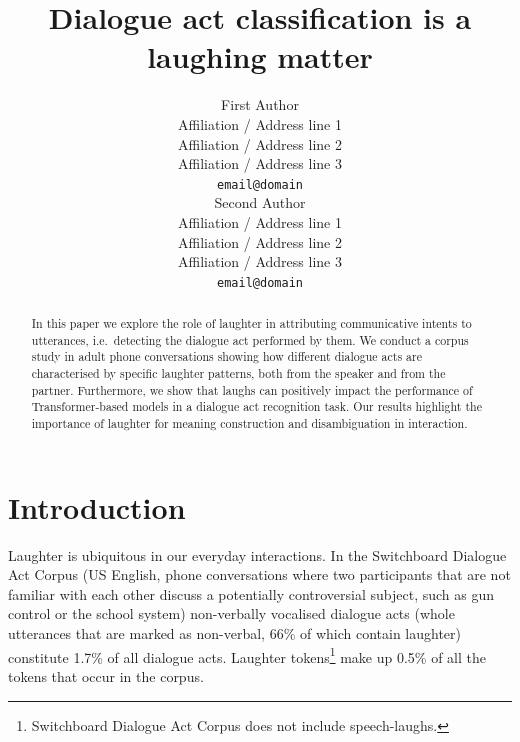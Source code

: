 \documentclass[11pt,a4paper]{article}
\title{Dialogue act classification is a laughing matter}
\author{First Author \\
  Affiliation / Address line 1 \\
  Affiliation / Address line 2 \\
  Affiliation / Address line 3 \\
  \texttt{email@domain} \\\And
  Second Author \\
  Affiliation / Address line 1 \\
  Affiliation / Address line 2 \\
  Affiliation / Address line 3 \\
  \texttt{email@domain} \\}
\date{}
\begin{document}
\maketitle
\begin{abstract}
  In this paper we explore the role of laughter in attributing
  communicative intents to utterances, i.e.\ detecting the dialogue act
  performed by them. We conduct a corpus study in adult
  phone conversations showing how different dialogue acts are
  characterised by specific laughter patterns, both from the speaker
  and from the partner. Furthermore, we show that laughs can
  positively impact the performance of Transformer-based models in a
  dialogue act recognition task.  Our results highlight the importance
  of laughter for meaning construction and disambiguation in
  interaction.
\end{abstract}


\section{Introduction}

Laughter is ubiquitous in our everyday interactions.  In the
Switchboard Dialogue Act Corpus \citep[SWDA,][]{jurafsky1997switchboard} (US
English, phone conversations where two participants that
are not familiar with each other discuss a potentially controversial
subject, such as gun control or the school system) non-verbally vocalised
dialogue acts (whole utterances that are marked as non-verbal, 66\% of
which contain laughter) constitute 1.7\% of all dialogue acts.
Laughter tokens\footnote{Switchboard Dialogue Act Corpus does not include speech-laughs.} make up 0.5\% of all the tokens that occur in the
corpus.
\end{document}

